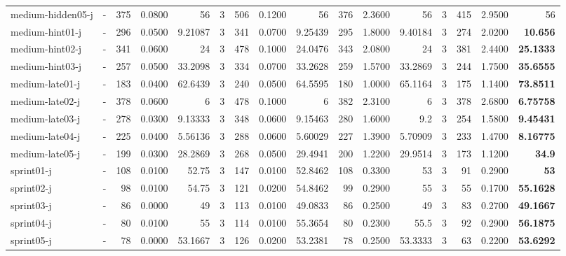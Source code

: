 \documentclass[a4paper]{article}
\begin{document}
\begin{sidewaystable}[h]
\begin{tabular}{l|r|r|r|r|r|r|r|r|r|r|r|r|r|r|r}
medium-hidden05-j & \multicolumn{1}{c|}{ - } & 375 & 0.0800 & 56 & 3 & 506 & 0.1200 & 56 & 376 & 2.3600 & 56 & 3 & 415 & 2.9500 & 56 \\
medium-hint01-j & \multicolumn{1}{c|}{ - } & 296 & 0.0500 & 9.21087 & 3 & 341 & 0.0700 & 9.25439 & 295 & 1.8000 & 9.40184 & 3 & 274 & 2.0200 & \textbf{10.656} \\
medium-hint02-j & \multicolumn{1}{c|}{ - } & 341 & 0.0600 & 24 & 3 & 478 & 0.1000 & 24.0476 & 343 & 2.0800 & 24 & 3 & 381 & 2.4400 & \textbf{25.1333} \\
medium-hint03-j & \multicolumn{1}{c|}{ - } & 257 & 0.0500 & 33.2098 & 3 & 334 & 0.0700 & 33.2628 & 259 & 1.5700 & 33.2869 & 3 & 244 & 1.7500 & \textbf{35.6555} \\
medium-late01-j & \multicolumn{1}{c|}{ - } & 183 & 0.0400 & 62.6439 & 3 & 240 & 0.0500 & 64.5595 & 180 & 1.0000 & 65.1164 & 3 & 175 & 1.1400 & \textbf{73.8511} \\
medium-late02-j & \multicolumn{1}{c|}{ - } & 378 & 0.0600 & 6 & 3 & 478 & 0.1000 & 6 & 382 & 2.3100 & 6 & 3 & 378 & 2.6800 & \textbf{6.75758} \\
medium-late03-j & \multicolumn{1}{c|}{ - } & 278 & 0.0300 & 9.13333 & 3 & 348 & 0.0600 & 9.15463 & 280 & 1.6000 & 9.2 & 3 & 254 & 1.5800 & \textbf{9.45431} \\
medium-late04-j & \multicolumn{1}{c|}{ - } & 225 & 0.0400 & 5.56136 & 3 & 288 & 0.0600 & 5.60029 & 227 & 1.3900 & 5.70909 & 3 & 233 & 1.4700 & \textbf{8.16775} \\
medium-late05-j & \multicolumn{1}{c|}{ - } & 199 & 0.0300 & 28.2869 & 3 & 268 & 0.0500 & 29.4941 & 200 & 1.2200 & 29.9514 & 3 & 173 & 1.1200 & \textbf{34.9} \\
sprint01-j & \multicolumn{1}{c|}{ - } & 108 & 0.0100 & 52.75 & 3 & 147 & 0.0100 & 52.8462 & 108 & 0.3300 & 53 & 3 & 91 & 0.2900 & \textbf{53} \\
sprint02-j & \multicolumn{1}{c|}{ - } & 98 & 0.0100 & 54.75 & 3 & 121 & 0.0200 & 54.8462 & 99 & 0.2900 & 55 & 3 & 55 & 0.1700 & \textbf{55.1628} \\
sprint03-j & \multicolumn{1}{c|}{ - } & 86 & 0.0000 & 49 & 3 & 113 & 0.0100 & 49.0833 & 86 & 0.2500 & 49 & 3 & 83 & 0.2700 & \textbf{49.1667} \\
sprint04-j & \multicolumn{1}{c|}{ - } & 80 & 0.0100 & 55 & 3 & 114 & 0.0100 & 55.3654 & 80 & 0.2300 & 55.5 & 3 & 92 & 0.2900 & \textbf{56.1875} \\
sprint05-j & \multicolumn{1}{c|}{ - } & 78 & 0.0000 & 53.1667 & 3 & 126 & 0.0200 & 53.2381 & 78 & 0.2500 & 53.3333 & 3 & 63 & 0.2200 & \textbf{53.6292} \\

\end{tabular}
\end{sidewaystable}
\end{document}
